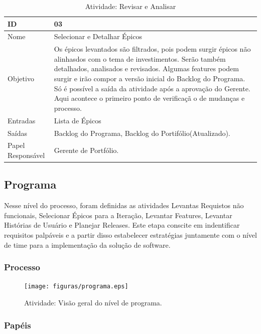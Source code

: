   \begin{table}[H]
    \centering
      \begin{tabular}{| m{5em} | m{10cm} |}
        \hline
        ID       & 03   \\ \hline
        Nome     & Selecionar e Detalhar Épicos   \\ \hline
        Objetivo & Os épicos levantados são filtrados, pois podem surgir épicos não alinhasdos com o tema de investimentos. Serão também detalhados, analisados e revisados. Algumas features podem surgir e irão compor a versão inicial do Backlog do Programa. Só é possível a saída da atividade após a aprovação do Gerente. Aqui acontece o primeiro ponto de verificaçã o de mudanças e processo. \\ \hline
        Entradas & Lista de Épicos   \\ \hline
        Saídas   & Backlog do Programa, Backlog do Portifólio(Atualizado). \\ \hline
        Papel Responsável   & Gerente de Portfólio. \\ \hline
      \end{tabular}
      \caption{Atividade: Revisar e Analisar}
      \label{tabela:atividade3}
  \end{table}

  \subsection{Programa}

  Nesse nível do processo, foram definidas as atividades Levantas Requistos não funcionais,
  Selecionar Épicos para a Iteração, Levantar Features, Levantar Histórias de Usuário e Planejar Releases.
  Este etapa conscite em indentificar requisitos palpáveis e a partir disso estabelecer estratégias
  juntamente com o nível de time para a implementação da solução de software.

  \subsubsection{Processo}

  \begin{figure}[H]
      \centering
    \texttt{[image: figuras/programa.eps]}
      \caption{Atividade: Visão geral do nível de programa.}
      \label{fig:progama}
  \end{figure}

  \subsubsection{Papéis}

